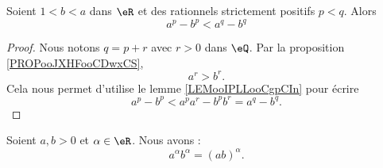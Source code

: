 \begin{corollary}       \label{CORooYWNNooLwKmiD}
	Soient \( 1<b<a\) dans \( \eR\) et des rationnels strictement positifs \( p<q\). Alors
	\begin{equation}
		a^p-b^p<a^q-b^q
	\end{equation}
\end{corollary}

\begin{proof}
	Nous notons \( q=p+r\) avec \( r>0\) dans \( \eQ\). Par la proposition \ref{PROPooJXHFooCDwxCS},
	\begin{equation}
		a^r>b^r.
	\end{equation}
	Cela nous permet d'utilise le lemme \ref{LEMooIPLLooCgpCIn} pour écrire
	\begin{equation}
		a^p-b^p<a^pa^r-b^pb^r=a^q-b^q.
	\end{equation}
\end{proof}

\begin{proposition}      \label{PROPooKWRGooMTbRdU}
	Soient \( a,b>0\) et \( \alpha\in \eR\). Nous avons :
	\begin{equation}
		a^{\alpha}b^{\alpha}=(ab)^{\alpha}.
	\end{equation}
\end{proposition}


